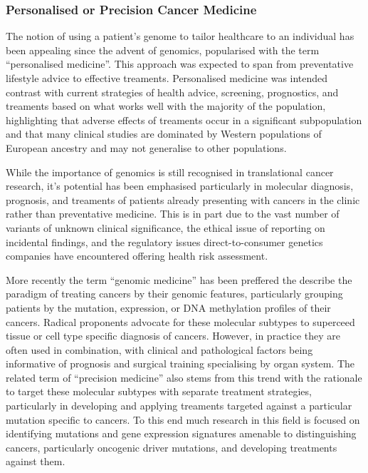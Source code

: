 \subsubsection{Personalised or Precision Cancer Medicine}
The notion of using a patient's genome to tailor healthcare to an individual has been appealing since the advent of genomics, popularised with the term ``personalised medicine''. This approach was expected to span from preventative lifestyle advice to effective treaments. Personalised medicine was intended contrast with current strategies of health advice, screening, prognostics, and treaments based on what works well with the majority of the population, highlighting that adverse effects of treaments occur in a significant subpopulation and that many clinical studies are dominated by Western populations of European ancestry and may not generalise to other populations.

While the importance of genomics is still recognised in translational cancer research, it's potential has been emphasised particularly in molecular diagnosis, prognosis, and treaments of patients already presenting with cancers in the clinic rather than preventative medicine. This is in part due to the vast number of variants of unknown clinical significance, the ethical issue of reporting on incidental findings, and the regulatory issues direct-to-consumer genetics companies have encountered offering health risk assessment.

More recently the term ``genomic medicine'' has been preffered the describe the paradigm of treating cancers by their genomic features, particularly grouping patients by the mutation, expression, or DNA methylation profiles of their cancers. Radical proponents advocate for these molecular subtypes to superceed tissue or cell type specific diagnosis of cancers. However, in practice they are often used in combination, with clinical and pathological factors being informative of prognosis and surgical training specialising by organ system. The related term of ``precision medicine'' also stems from this trend with the rationale to target these molecular subtypes with separate treatment strategies, particularly in developing and applying treaments targeted against a particular mutation specific to cancers. To this end much research in this field is focused on identifying mutations and gene expression signatures amenable to distinguishing cancers, particularly oncogenic driver mutations, and developing treatments against them.


